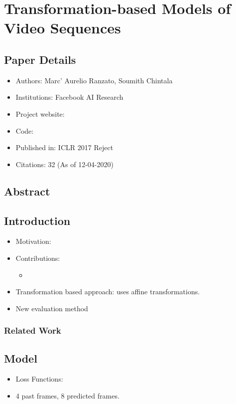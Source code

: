 \documentclass{article}
\begin{document}
    \section{Transformation-based Models of Video Sequences}\label{sec:Transformation_based_Models_of_Video_Sequences}
    \subsection*{Paper Details}
    \begin{itemize}
        \item Authors: Marc' Aurelio Ranzato, Soumith Chintala
        \item Institutions: Facebook AI Research
        \item Project website:
        \item Code:
        \item Published in: ICLR 2017 Reject
        \item Citations: 32 (As of 12-04-2020)
    \end{itemize}

    \subsection*{Abstract}

    \subsection{Introduction}\label{subsec:Transformation_based_Models_of_Video_Sequences:introduction}
    \begin{itemize}
        \item Motivation:
        \item Contributions:
        \begin{itemize}
            \item
        \end{itemize}
        \item Transformation based approach: uses affine transformations.
        \item New evaluation method
    \end{itemize}

    \subsubsection{Related Work}\label{subsubsec:Transformation_based_Models_of_Video_Sequences:related-work}

    \subsection{Model}\label{subsec:Transformation_based_Models_of_Video_Sequences:model}
    \begin{itemize}
        \item Loss Functions:
        \item 4 past frames, 8 predicted frames.
    \end{itemize}
\end{document}
